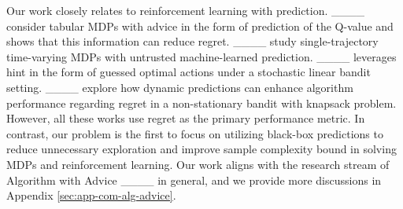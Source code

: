 

Our work closely relates to reinforcement learning with prediction. ____ consider tabular MDPs with advice in the form of prediction of the Q-value and shows that this information can reduce regret. ____ study single-trajectory time-varying MDPs with untrusted machine-learned prediction. ____ leverages hint in the form of guessed optimal actions under a stochastic linear bandit setting. ____ explore how dynamic predictions can enhance algorithm performance regarding regret in a non-stationary bandit with knapsack problem. However, all these works use regret as the primary performance metric. In contrast, our problem is the first to focus on utilizing black-box predictions to reduce unnecessary exploration and improve sample complexity bound in solving MDPs and reinforcement learning. Our work aligns with the research stream of Algorithm with Advice ____ in general, and we provide more discussions in Appendix \ref{sec:app-com-alg-advice}.



